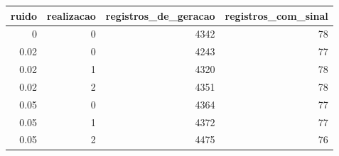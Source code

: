 \begin{tabular}{rrrr}
\toprule
ruido & realizacao & registros\_de\_geracao & registros\_com\_sinal \\
\midrule
0 & 0 & 4342 & 78 \\
0.02 & 0 & 4243 & 77 \\
0.02 & 1 & 4320 & 78 \\
0.02 & 2 & 4351 & 78 \\
0.05 & 0 & 4364 & 77 \\
0.05 & 1 & 4372 & 77 \\
0.05 & 2 & 4475 & 76 \\
\bottomrule
\end{tabular}
